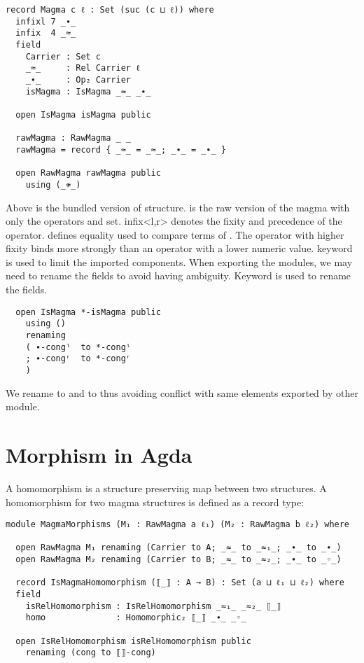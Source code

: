 \begin{verbatim}
record Magma c ℓ : Set (suc (c ⊔ ℓ)) where
  infixl 7 _∙_
  infix  4 _≈_
  field
    Carrier : Set c
    _≈_     : Rel Carrier ℓ
    _∙_     : Op₂ Carrier
    isMagma : IsMagma _≈_ _∙_

  open IsMagma isMagma public

  rawMagma : RawMagma _ _
  rawMagma = record { _≈_ = _≈_; _∙_ = _∙_ }

  open RawMagma rawMagma public
    using (_≉_)
\end{verbatim}

Above is the bundled version of  structure.  is
the raw version of the magma with only the operators and set. infix<l,r> denotes
the fixity and precedence of the operator.  defines equality used to
compare terms of . The operator with higher fixity binds more
strongly than an operator with a lower numeric value.  keyword is
used to limit the imported components. When exporting the modules, we may need
to rename the fields to avoid having ambiguity. Keyword  is
used to rename the fields.

\label{code:rename}
\begin{verbatim}
  open IsMagma *-isMagma public
    using ()
    renaming
    ( ∙-congˡ  to *-congˡ
    ; ∙-congʳ  to *-congʳ
    )
\end{verbatim} 

We rename   to  and   to
 thus avoiding conflict with same elements exported by other
module.

\section{Morphism in Agda}
A homomorphism is a structure preserving map between two structures. A
homomorphism for two magma structures is defined as a record type:
\begin{verbatim}
module MagmaMorphisms (M₁ : RawMagma a ℓ₁) (M₂ : RawMagma b ℓ₂) where

  open RawMagma M₁ renaming (Carrier to A; _≈_ to _≈₁_; _∙_ to _∙_)
  open RawMagma M₂ renaming (Carrier to B; _≈_ to _≈₂_; _∙_ to _◦_)

  record IsMagmaHomomorphism (⟦_⟧ : A → B) : Set (a ⊔ ℓ₁ ⊔ ℓ₂) where
  field
    isRelHomomorphism : IsRelHomomorphism _≈₁_ _≈₂_ ⟦_⟧
    homo              : Homomorphic₂ ⟦_⟧ _∙_ _◦_

  open IsRelHomomorphism isRelHomomorphism public
    renaming (cong to ⟦⟧-cong)
\end{verbatim}

